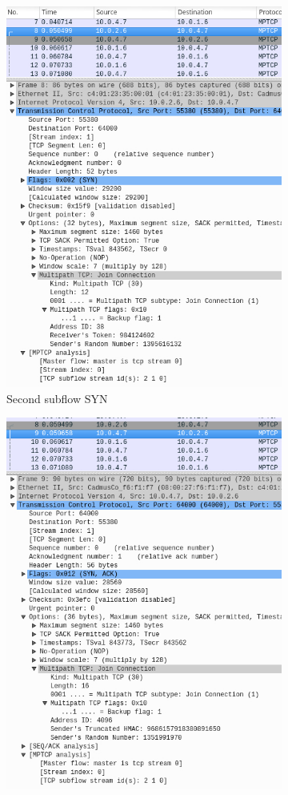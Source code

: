 \documentclass[a4paper,11pt]{article}
\begin{document}
			
			\begin{figure}[h!]
			\centering
			\label{fig:secondsubflow}
			\begin{subfigure}{.5\textwidth}
			  \centering
			  \label{fig:secondflow}
			  \includegraphics[width=.8\linewidth]{pictures/secondflow.jpg}
			  \caption{Second subflow SYN}
			\end{subfigure}%
			\begin{subfigure}{.5\textwidth}
			  \centering
			  \label{fig:secondflowresponse}
			  \includegraphics[width=.8\linewidth]{pictures/secondflowresponse.jpg}

\end{subfigure}
\end{figure}
\end{document}
